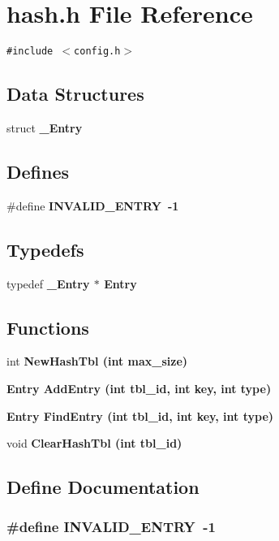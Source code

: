 \section{hash.h File Reference}
\label{hash_8h}
{\tt \#include $<$config.h$>$}\par
\subsection*{Data Structures}
\begin{CompactItemize}
\item 
struct \bf{\_\-Entry}
\end{CompactItemize}
\subsection*{Defines}
\begin{CompactItemize}
\item 
\#define \bf{INVALID\_\-ENTRY}~-1
\end{CompactItemize}
\subsection*{Typedefs}
\begin{CompactItemize}
\item 
typedef \bf{\_\-Entry} $\ast$ \bf{Entry}
\end{CompactItemize}
\subsection*{Functions}
\begin{CompactItemize}
\item 
int \bf{New\-Hash\-Tbl} (int max\_\-size)
\item 
\bf{Entry} \bf{Add\-Entry} (int tbl\_\-id, int key, int type)
\item 
\bf{Entry} \bf{Find\-Entry} (int tbl\_\-id, int key, int type)
\item 
void \bf{Clear\-Hash\-Tbl} (int tbl\_\-id)
\end{CompactItemize}


\subsection{Define Documentation}
\subsubsection{\setlength{\rightskip}{0pt plus 5cm}\#define INVALID\_\-ENTRY~-1}\label{hash_8h_1dfbc2208b3f32fc3d8dca63bd941c08}




